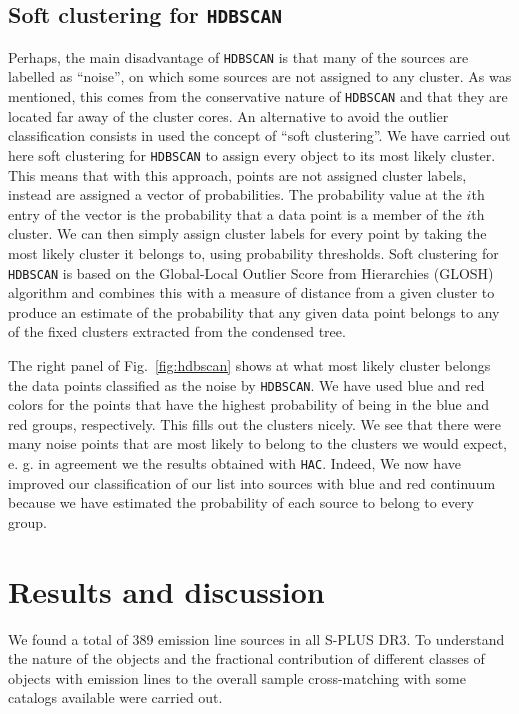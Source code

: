 \documentclass[fleqn,usenatbib]{mnras}
\begin{document}
\subsection{Soft clustering for \texttt{HDBSCAN}}

Perhaps, the main disadvantage of \texttt{HDBSCAN} is that many of the sources are labelled
as ``noise'', on which some sources are not assigned to any cluster. As was mentioned,
this comes from the conservative nature of \texttt{HDBSCAN}
and that they are located far away of the cluster cores. An alternative to avoid the outlier
classification consists in used the concept of ``soft clustering''. We have carried out here soft
clustering for \texttt{HDBSCAN} to assign every object to its most likely cluster.
This means that with this approach, points are not assigned cluster labels, instead are
assigned a vector of probabilities. The probability value at the $i$th entry of the vector
is the probability that a data point is a member of the $i$th cluster. We can then simply
assign cluster labels for every point by taking the most likely cluster it belongs to,
using probability thresholds. Soft clustering for \texttt{HDBSCAN} is based on the
Global-Local Outlier Score from Hierarchies (GLOSH) algorithm \citep{Campello:2015}
and combines this with a
measure of distance from a given cluster to produce an estimate of the probability that any
given data point belongs to any of the fixed clusters extracted from the
condensed tree.

The right panel of Fig.~\ref{fig:hdbscan} shows at what most likely cluster belongs the data
points classified as the noise by \texttt{HDBSCAN}. We have used blue and red colors for the
points that have the highest probability of being in the blue and red groups, respectively.
This fills out the clusters nicely. We see that there were many noise points that are most
likely to belong to the clusters we would expect, e. g. in agreement we the results obtained
with \texttt{HAC}. Indeed, We now have improved our classification of our list into sources
with blue and red continuum because we have estimated the probability of each source to belong
to every group.


\section{Results and discussion}
\label{sec:results}

We found a total of 389 emission line sources in all S-PLUS DR3.
To understand the nature of the objects  and the fractional
contribution of different classes
of objects with emission lines to the overall sample cross-matching
with some catalogs available were carried out.
\end{document}
